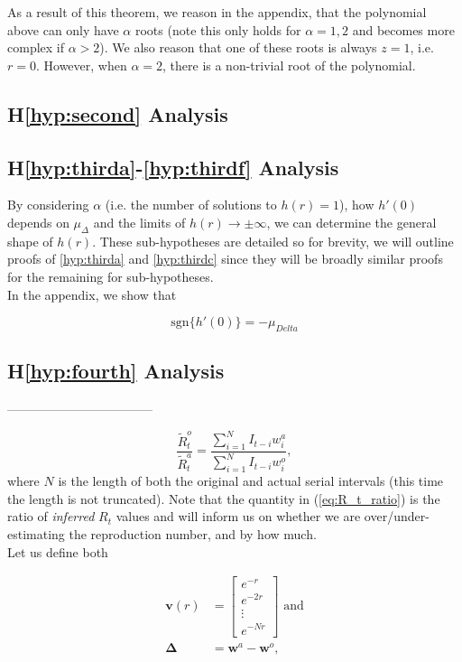 \documentclass[10pt,journal,compsoc]{IEEEtran}
\begin{document}
As a result of this theorem, we reason in the appendix, that the polynomial above can only have $\alpha$ roots (note this only holds for $\alpha=1,2$ and becomes more complex if $\alpha>2$). We also reason that one of these roots is always $z=1$, i.e. $r=0$. However, when $\alpha=2$, there is a non-trivial root of the polynomial.

\subsection{H\ref{hyp:second} Analysis}

\subsection{H\ref{hyp:thirda}-\ref{hyp:thirdf} Analysis}

By considering $\alpha$ (i.e. the number of solutions to $h(r)=1$), how $h'(0)$ depends on $\mu_{\Delta}$ and the limits of $h(r) \rightarrow \pm \infty$, we can determine the general shape of $h(r)$. These sub-hypotheses are detailed so for brevity, we will outline proofs of \ref{hyp:thirda} and \ref{hyp:thirdc} since they will be broadly similar proofs for the remaining for sub-hypotheses.\\

In the appendix, we show that

\begin{equation}
    \mathrm{sgn}\{ h'(0)\} = -\mu_{Delta}
\end{equation}



\subsection{H\ref{hyp:fourth} Analysis}
-----------------------------------


\begin{equation} \label{eq:R_t_ratio}
\frac{\tilde{R}_t^o}{\tilde{R}_t^a} = \frac{\sum_{i=1}^{N}I_{t-i}w_i^a}{\sum_{i=1}^{N}I_{t-i}w_i^o},
\end{equation}
where $N$ is the length of both the original and actual serial intervals (this time the length is not truncated). Note that the quantity in (\ref{eq:R_t_ratio}) is the ratio of \textit{inferred} $R_t$ values and will inform us on whether we are over/under-estimating the reproduction number, and by how much.\\
Let us define both

  \begin{align*}
    \boldsymbol{v}(r) &= \begin{bmatrix}
           e^{-r} \\
           e^{-2r} \\
           \vdots \\
           e^{-Nr}
         \end{bmatrix} \text{ and}\\
         \boldsymbol{\Delta} &= \boldsymbol{w}^a-\boldsymbol{w}^o,
  \end{align*}
  
\end{document}
